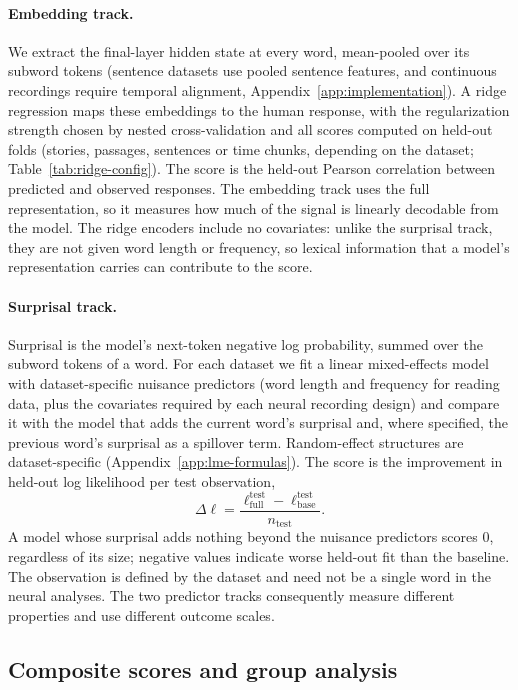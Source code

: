 \paragraph{Embedding track.}
We extract the final-layer hidden state at every word, mean-pooled over its subword tokens (sentence datasets use pooled sentence features, and continuous recordings require temporal alignment, Appendix~\ref{app:implementation}). A ridge regression maps these embeddings to the human response, with the regularization strength chosen by nested cross-validation and all scores computed on held-out folds (stories, passages, sentences or time chunks, depending on the dataset; Table~\ref{tab:ridge-config}). The score is the held-out Pearson correlation between predicted and observed responses. The embedding track uses the full representation, so it measures how much of the signal is linearly decodable from the model. The ridge encoders include no covariates: unlike the surprisal track, they are not given word length or frequency, so lexical information that a model's representation carries can contribute to the score.

\paragraph{Surprisal track.}
Surprisal is the model's next-token negative log probability, summed over the subword tokens of a word. For each dataset we fit a linear mixed-effects model with dataset-specific nuisance predictors (word length and frequency for reading data, plus the covariates required by each neural recording design) and compare it with the model that adds the current word's surprisal and, where specified, the previous word's surprisal as a spillover term. Random-effect structures are dataset-specific (Appendix~\ref{app:lme-formulas}). The score is the improvement in held-out log likelihood per test observation,
\begin{equation}
\Delta\ell=\frac{\ell_{\mathrm{full}}^{\mathrm{test}}-\ell_{\mathrm{base}}^{\mathrm{test}}}{n_{\mathrm{test}}}.
\label{eq:dll}
\end{equation}
A model whose surprisal adds nothing beyond the nuisance predictors scores 0, regardless of its size; negative values indicate worse held-out fit than the baseline. The observation is defined by the dataset and need not be a single word in the neural analyses. The two predictor tracks consequently measure different properties and use different outcome scales.

\subsection{Composite scores and group analysis}
\label{sec:design-stats}

